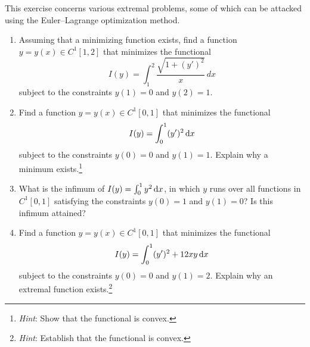 \documentclass{../homework}
\date{Thursday 4/4}
\author{}
\begin{document}
\begin{Exercise}
	This exercise concerns various extremal problems, some of which can
  be attacked using the Euler--Lagrange optimization method.
	\begin{enumerate}
  \item Assuming that a minimizing function exists, find a function
    \(y = y(x) \in C^1[1,2]\) that minimizes the functional
    \begin{equation*}
      I(y) = \int_1^2 \frac{ \sqrt{1 + (y')^2}}{x}\,dx
    \end{equation*}
    subject to the constraints \(y(1) = 0\) and \(y(2) =1\).

    \begin{solution}

    \end{solution}

  \item Find a function \(y = y(x) \in C^1[0,1]\) that minimizes the
    functional
    \[
      I(y) = \int_0^1 (y')^2 \mathop{}\! \mathrm d x
    \]
    subject to the constraints \(y(0) = 0\) and \(y(1) =1\).  Explain
    why a minimum exists.\footnote{\emph{Hint}: Show that the
      functional is convex.}

    \begin{solution}

    \end{solution}

  \item What is the infimum of \(I(y) = \int_0^1 y^2 \mathop{}\! \mathrm d x\), in
    which \(y\) runs over all functions in \(C^1[0,1]\) satisfying the
    constraints \(y(0) = 1\) and \(y(1) = 0\)?  Is this infimum
    attained?

    \begin{solution}

    \end{solution}

  \item Find a function \(y = y(x) \in C^1[0,1]\) that minimizes the
    functional
    \begin{equation*}
      I(y) = \int_0^1 (y')^2 + 12 xy \mathop{}\! \mathrm d x
    \end{equation*}
    subject to the constraints \(y(0) = 0\) and \(y(1) = 2\).  Explain
    why an extremal function exists.\footnote{\emph{Hint}: Establish
      that the functional is convex.}

    \begin{solution}

    \end{solution}


\end{enumerate}
\end{Exercise}
\end{document}
